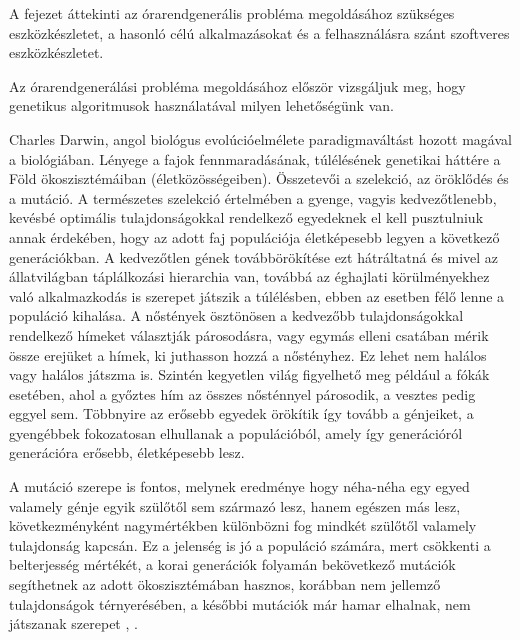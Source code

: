 
A fejezet áttekinti az órarendgenerális probléma megoldásához szükséges eszközkészletet, a hasonló célú alkalmazásokat és a felhasználásra szánt szoftveres eszközkészletet.


Az órarendgenerálási probléma megoldásához először vizsgáljuk meg, hogy genetikus algoritmusok használatával milyen lehetőségünk van.


Charles Darwin, angol biológus evolúcióelmélete paradigmaváltást hozott magával a biológiában. 
Lényege a fajok fennmaradásának, túlélésének genetikai háttére a Föld ökoszisztémáiban 
(életközösségeiben). Összetevői a szelekció, az öröklődés és a mutáció. A természetes 
szelekció értelmében a gyenge, vagyis kedvezőtlenebb, kevésbé optimális tulajdonságokkal 
rendelkező egyedeknek el kell pusztulniuk annak érdekében, hogy az adott faj populációja 
életképesebb legyen a következő generációkban. A kedvezőtlen gének továbbörökítése ezt
hátráltatná és mivel az állatvilágban táplálkozási hierarchia van, továbbá az éghajlati 
körülményekhez való alkalmazkodás is szerepet játszik a túlélésben, ebben az esetben félő 
lenne a populáció kihalása. A nőstények ösztönösen a kedvezőbb tulajdonságokkal rendelkező 
hímeket választják párosodásra, vagy egymás elleni csatában mérik össze erejüket a hímek, ki 
juthasson hozzá a nőstényhez. Ez lehet nem halálos vagy halálos játszma is. Szintén kegyetlen 
világ figyelhető meg például a fókák esetében, ahol a győztes hím az összes nősténnyel párosodik, 
a vesztes pedig eggyel sem. Többnyire az erősebb egyedek örökítik így tovább a génjeiket, a
gyengébbek fokozatosan elhullanak a populációból, amely így generációról generációra erősebb,
életképesebb lesz.

A mutáció szerepe is fontos, melynek eredménye hogy néha-néha egy egyed
valamely génje egyik szülőtől sem származó lesz, hanem egészen más lesz, következményként
nagymértékben különbözni fog mindkét szülőtől valamely tulajdonság kapcsán. Ez a jelenség is 
jó a populáció számára, mert csökkenti a belterjesség mértékét, a korai generációk folyamán
bekövetkező mutációk segíthetnek az adott ökoszisztémában hasznos, korábban nem jellemző
tulajdonságok térnyerésében, a későbbi mutációk már hamar elhalnak, nem játszanak szerepet \cite{okologia}, \cite{jelasity1999genetikus}.


